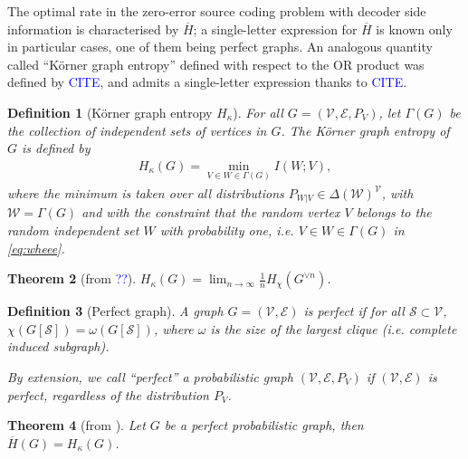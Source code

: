 \documentclass[conference,a4paper]{IEEEtran}
\newtheorem{theorem}{Theorem}[section]
\newtheorem{definition}[theorem]{Definition}
\begin{document}
The optimal rate in the zero-error source coding problem with decoder side information is characterised by $\overline{H}$; a single-letter expression for $\overline{H}$ is known only in particular cases, one of them being perfect graphs. An analogous quantity called ``Körner graph entropy'' defined with respect to the OR product was defined by \textcolor{blue}{CITE}, and admits a single-letter expression thanks to \textcolor{blue}{CITE}.

\begin{definition}[Körner graph entropy $H_\kappa$]
For all $G = (\mathcal{V}, \mathcal{E}, P_V)$, let $\Gamma(G)$ be the collection of independent sets of vertices in $G$. The K\"{o}rner graph entropy of $G$ is defined by
\begin{align}
    H_\kappa(G) = \min_{V \in W \in \Gamma(G)} I(W;V), \label{eq:wheee}
\end{align}
where the minimum is taken over all distributions $P_{W|V} \in \Delta(\mathcal{W})^{\mathcal{V}}$, with $\mathcal{W} = \Gamma(G)$ and with the constraint that the random vertex $V$ belongs to the random independent set $W$ with probability one, i.e. $V \in W \in \Gamma(G)$ in \eqref{eq:wheee}.
\end{definition}

\begin{theorem}[from \textcolor{blue}{??}]
    $H_\kappa(G) = \lim_{n \rightarrow \infty} \frac{1}{n}H_\chi(G^{\vee n})$.
\end{theorem}

\begin{definition}[Perfect graph]
    A graph $G = (\mathcal{V}, \mathcal{E})$ is perfect if for all $\mathcal{S} \subset \mathcal{V}$, $\chi(G[\mathcal{S}]) = \omega(G[\mathcal{S}])$, where $\omega$ is the size of the largest clique (i.e. complete induced subgraph).
    
    By extension, we call ``perfect'' a probabilistic graph $(\mathcal{V}, \mathcal{E}, P_{V})$ if $(\mathcal{V}, \mathcal{E})$ is perfect, regardless of the distribution $P_{V}$.
\end{definition}

\begin{theorem}[from \cite{csiszar1990entropy}]\label{th:Hbarperfect}
    Let $G$ be a perfect probabilistic graph, then $\overline{H}(G) = H_\kappa(G)$.
\end{theorem}
\fi
\end{document}
